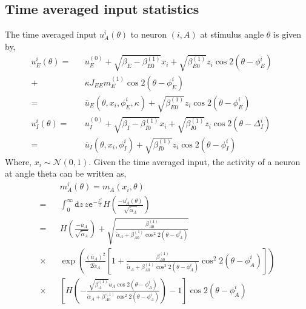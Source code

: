 \subsection{Time averaged input statistics}
The time averaged input $u_A^{i} (\theta)$ to neuron $(i, A)$ at stimulus angle $\theta$ is given by, 
\begin{eqnarray}
u_E^{i} (\theta) =&& u^{(0)}_E + \sqrt{\beta_E - \beta_{E0}^{(1)}} x_i +  \sqrt{\beta_{E0}^{(1)}} z_i \cos 2 (\theta - \phi_E^i) \,\,\,\, \,\,\,\,\nonumber \\
+&& \kappa J_{EE} m_E^{(1)} \cos 2 ( \theta  - \phi_E^i) \\
=&& \overline{u}_E(\theta, x_i, \phi_E^i, \kappa) +  \sqrt{\beta_{E0}^{(1)}} z_i \cos 2 (\theta - \phi_E^i) \\
u_I^{i} (\theta) =&& u^{(0)}_I + \sqrt{\beta_I - \beta_{I0}^{(1)}} x_i +  \sqrt{\beta_{I0}^{(1)}} z_i \cos 2 (\theta - \Delta_I^i) \\
=&& \overline{u}_I(\theta, x_i, \phi_I^i) +  \sqrt{\beta_{I0}^{(1)}} z_i \cos 2 (\theta - \phi_I^i)
\end{eqnarray}
Where, $x_i \sim \mathcal{N}(0, 1)$. 
Given the time averaged input, the activity of a neuron at angle theta can be written as, 
\begin{eqnarray}
&&m_A^i(\theta) = m_A(x_i, \theta) \nonumber \\
=&& \int_{0}^{\infty} \mathtt{d} z\,  z \mathtt{e}^{-\frac{z^2}{2}} H\left( \frac{-u_A^i(\theta)}{\sqrt{\tilde{\alpha}_A }} \right)  \\
=&& H\left( \frac{-\overline{u}_A }{\sqrt{\tilde{\alpha}_A }}  \right) + \sqrt{\frac{\beta_{A0}^{(1)} }{  \tilde{\alpha}_A + \beta_{A0}^{(1)} \cos^2 2 (\theta - \phi_A^i) }} \nonumber \\ 
\times&&  \exp \left( \frac{\left( \overline{u}_A \right)^2  }{ 2 \tilde{\alpha}_A} \left[ 1 + \frac{\beta_{A0}^{(1)} }{ \tilde{\alpha}_A + \beta_{A0}^{(1)} \cos^2 2 (\theta - \phi_A^i)  } \cos^2 2 (\theta - \phi_A^i) \right] \right) \nonumber \\
\times&& \left[ H \left( - \frac{ \sqrt{\beta_A^{(1)} } \overline{u}_A \cos 2 (\theta - \phi_A^i)} {  \tilde{\alpha}_A + \beta_{A0}^{(1)} \cos^2 2 (\theta - \phi_A^i) } \right) - 1 \right] \cos2(\theta - \phi_A^i) \label{mAiofTheta} 
\end{eqnarray}

